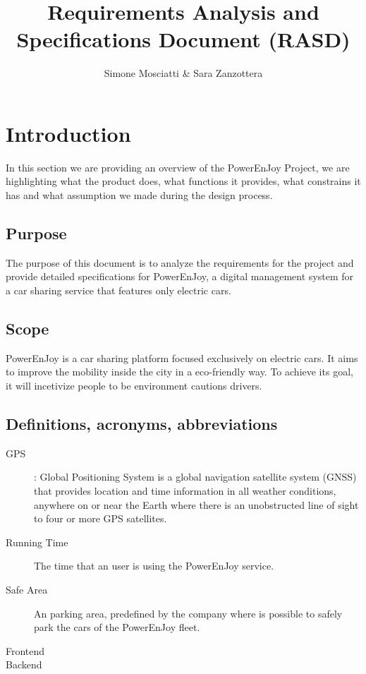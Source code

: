 \documentclass[11pt]{article} %
\title{Requirements Analysis and Specifications Document (RASD)}
\author{Simone Mosciatti \& Sara Zanzottera}
\newcommand{\pe}{PowerEnJoy }
\newcommand{\pecomma}{PowerEnJoy, }
\begin{document}
\maketitle
\newpage
\tableofcontents
\newpage


\section{Introduction}

In this section we are providing an overview of the \pe Project, we are highlighting what the product does, what functions it provides, what constrains it has and what assumption we made during the design process.

  \subsection{Purpose}
  
The purpose of this document is to analyze the requirements for the project and provide detailed specifications for \pecomma a digital management system for a car sharing service that features only electric cars.
  
  \subsection{Scope}
  
\pe is a car sharing platform focused exclusively on electric cars. It aims to improve the mobility inside the city in a eco-friendly way. To achieve its goal, it will incetivize people to be environment cautions drivers.

\subsection{Definitions, acronyms, abbreviations}
  \begin{description}
  	\item[GPS]: Global Positioning System is a global navigation satellite system (GNSS) that provides location and time information in all weather conditions, anywhere on or near the Earth where there is an unobstructed line of sight to four or more GPS satellites.
  	\item[Running Time] The time that an user is using the \pe service.
  	\item[Safe Area] An parking area, predefined by the company where is possible to safely park the cars of the \pe fleet.
  	\item[Frontend]
  	\item[Backend]
  \end{description}
\end{document}
